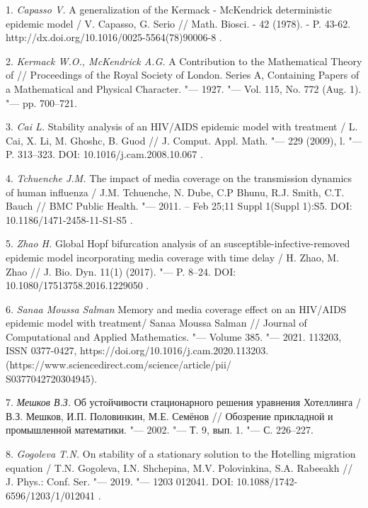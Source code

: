 \litlist

1. {\it  Capasso V.} A generalization of the Kermack - McKendrick
deterministic epidemic model / V. Capasso, G. Serio // Math.
Biosci. - 42 (1978). - P. 43-62.
http://dx.doi.org/10.1016/0025-5564(78)90006-8 .

2. {\it  Kermack W.O.,  McKendrick A.G.} A Contribution to the
Mathematical Theory of  // Proceedings of the Royal Society of
London. Series A, Containing Papers of a Mathematical and Physical
Character. "--- 1927. "--- Vol. 115, No. 772 (Aug. 1). "--- pp.
700--721.

3. {\it   Cai L.} Stability analysis of an HIV/AIDS epidemic model
with treatment / L. Cai, X. Li, M. Ghoshc, B. Guod // J. Comput.
Appl. Math. "--- 229 (2009), l. "--- P. 313--323. DOI:
10.1016/j.cam.2008.10.067 .

4.  {\it Tchuenche J.M.} The impact of media coverage on the
transmission dynamics of human influenza / J.M. Tchuenche, N.
Dube, C.P Bhunu, R.J. Smith, C.T. Bauch // BMC Public Health. "---
2011. -- Feb 25;11 Suppl 1(Suppl 1):S5. DOI:
10.1186/1471-2458-11-S1-S5 .

5. {\it Zhao H.} Global Hopf bifurcation analysis of an
susceptible-infective-removed epidemic model incorporating media
coverage with time delay / H. Zhao, M. Zhao // J. Bio. Dyn. 11(1)
(2017). "--- P. 8--24. DOI: 10.1080/17513758.2016.1229050 .

6. {\it Sanaa Moussa Salman} Memory and media coverage effect on
an HIV/AIDS epidemic model with treatment/ Sanaa Moussa Salman //
Journal of Computational and Applied Mathematics. "--- Volume 385.
"--- 2021. 113203, ISSN 0377-0427,
https://doi.org/10.1016/j.cam.2020.113203.
(https://www.sciencedirect.com/science/article/pii/\\S0377042720304945).


7. {\it  Мешков В.З.} Об устойчивости стационарного решения
уравнения Хотеллинга / В.З.  Мешков, И.П. Половинкин, М.Е. Семёнов
// Обозрение прикладной и промышленной математики. "--- 2002. "--- Т. 9,
вып. 1. "--- С. 226--227.


8. {\it  Gogoleva T.N.} On stability of a stationary solution to
the Hotelling migration equation / T.N. Gogoleva, I.N. Shchepina,
M.V. Polovinkina, S.A. Rabeeakh // J. Phys.: Conf. Ser. "--- 2019.
"--- 1203 012041. DOI: 10.1088/1742-6596/1203/1/012041 .

